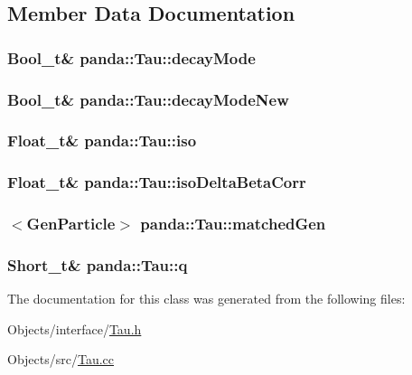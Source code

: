 \subsection{Member Data Documentation}
\hypertarget{classpanda_1_1Tau_a66dff67292b497ccc8d1ff461daab550}{
\subsubsection[{decayMode}]{\setlength{\rightskip}{0pt plus 5cm}Bool\_\-t\& {\bf panda::Tau::decayMode}}}
\label{classpanda_1_1Tau_a66dff67292b497ccc8d1ff461daab550}
\hypertarget{classpanda_1_1Tau_ac7515cf0cc6b9dd2f93ceed30c8ec7a3}{
\subsubsection[{decayModeNew}]{\setlength{\rightskip}{0pt plus 5cm}Bool\_\-t\& {\bf panda::Tau::decayModeNew}}}
\label{classpanda_1_1Tau_ac7515cf0cc6b9dd2f93ceed30c8ec7a3}
\hypertarget{classpanda_1_1Tau_a7ee0e9781f98acefca2eb8caa266329b}{
\subsubsection[{iso}]{\setlength{\rightskip}{0pt plus 5cm}Float\_\-t\& {\bf panda::Tau::iso}}}
\label{classpanda_1_1Tau_a7ee0e9781f98acefca2eb8caa266329b}
\hypertarget{classpanda_1_1Tau_aee6992ff035351edcb1cf8cb3d9e8f31}{
\subsubsection[{isoDeltaBetaCorr}]{\setlength{\rightskip}{0pt plus 5cm}Float\_\-t\& {\bf panda::Tau::isoDeltaBetaCorr}}}
\label{classpanda_1_1Tau_aee6992ff035351edcb1cf8cb3d9e8f31}
\hypertarget{classpanda_1_1Tau_ab7eeac10774a2e9c7c5920ac360c034b}{
\subsubsection[{matchedGen}]{$<${\bf GenParticle}$>$ {\bf panda::Tau::matchedGen}}}
\label{classpanda_1_1Tau_ab7eeac10774a2e9c7c5920ac360c034b}
\hypertarget{classpanda_1_1Tau_a70d2cb37c2bc4ed1e17db5725b727389}{
\subsubsection[{q}]{\setlength{\rightskip}{0pt plus 5cm}Short\_\-t\& {\bf panda::Tau::q}}}
\label{classpanda_1_1Tau_a70d2cb37c2bc4ed1e17db5725b727389}


The documentation for this class was generated from the following files:\begin{DoxyCompactItemize}
\item 
Objects/interface/\hyperlink{Tau_8h}{Tau.h}\item 
Objects/src/\hyperlink{Tau_8cc}{Tau.cc}\end{DoxyCompactItemize}
